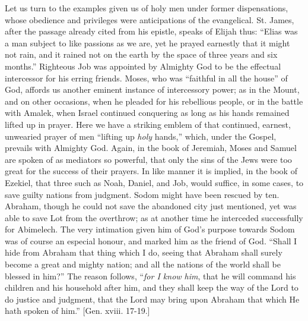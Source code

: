 Let us turn to the examples given us of holy men under former
dispensations, whose obedience and privileges were anticipations of
the evangelical. St. James, after the passage already cited from his
epistle, speaks of Elijah thus: ``Elias was a man subject to like
passions as we are, yet he prayed earnestly that it might not rain,
and it rained not on the earth by the space of three years and six
months.'' Righteous Job was appointed by Almighty God to be the
effectual intercessor for his erring friends. Moses, who was ``faithful in all the house'' of God, affords us another
eminent instance of intercessory power; as in the Mount, and on other
occasions, when he pleaded for his rebellious people, or in the battle
with Amalek, when Israel continued conquering as long as his hands
remained lifted up in prayer. Here we have a striking emblem of that
continued, earnest, unwearied prayer of men ``lifting up \emph{holy}
hands,'' which, under the Gospel, prevails with Almighty God.
Again, in the book of Jeremiah, Moses and Samuel are spoken of as
mediators so powerful, that only the sins of the Jews were too great
for the success of their prayers. In like manner it is implied, in the
book of Ezekiel, that three such as Noah, Daniel, and Job, would
suffice, in some cases, to save guilty nations from judgment. Sodom
might have been rescued by ten. Abraham, though he could not save the
abandoned city just mentioned, yet was able to save Lot from the
overthrow; as at another time he interceded successfully for Abimelech.
The very intimation given him of God's purpose towards Sodom was of
course an especial honour, and marked him as the friend of God.
``Shall I hide from Abraham that thing which I do, seeing that
Abraham shall surely become a great and mighty nation; and all the
nations of the world shall be blessed in him?'' The reason
follows, ``\emph{for I know him}, that he will command his
children and his household after him, and they shall keep the way of
the Lord to do justice and judgment, that the Lord may bring upon
Abraham that which He hath spoken of him.'' [Gen. xviii. 17-19.]

